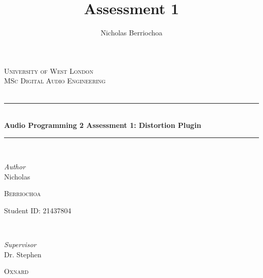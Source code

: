 \documentclass{article}
\title{Assessment 1}
\author{Nicholas Berriochoa}
\begin{document}
\begin{titlepage} %
	\newcommand{\HRule}{\rule{\linewidth}{0.5mm}} %

	\center %


	\textsc{\LARGE University of West London}\\[1.5cm] %

	\textsc{\Large MSc Digital Audio Engineering}\\[0.5cm] %

	\textsc{\large }\\[0.5cm] %


	\HRule\\[0.4cm]

	{\huge\bfseries Audio Programming 2 Assessment 1: Distortion Plugin}\\[0.4cm] %

	\HRule\\[1.5cm]


	\begin{minipage}{0.4\textwidth}
		\begin{flushleft}
			\large
			\textit{Author}\\
			Nicholas

      \textsc{Berriochoa} %

      Student ID: 21437804
		\end{flushleft}
	\end{minipage}
	~
	\begin{minipage}{0.4\textwidth}
		\begin{flushright}
			\large
			\textit{Supervisor}\\
			Dr. Stephen

			\textsc{Oxnard} %
		\end{flushright}
	\end{minipage}


\end{titlepage}
\end{document}
